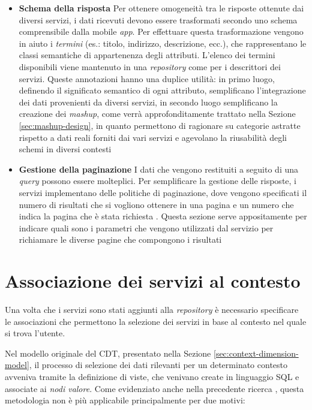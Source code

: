 \begin{itemize}
\begin{enumerate}
	\end{enumerate}
	\item \textbf{Schema della risposta}
	Per ottenere omogeneità tra le risposte ottenute dai diversi servizi, i dati ricevuti devono essere trasformati secondo uno schema comprensibile dalla mobile \emph{app}. Per effettuare questa trasformazione vengono in aiuto i \emph{termini} (es.: titolo, indirizzo, descrizione, ecc.), che rappresentano le classi semantiche di appartenenza degli attributi. L'elenco dei termini disponibili viene mantenuto in una \emph{repository} come per i descrittori dei servizi. Queste annotazioni hanno una duplice utilità: in primo luogo, definendo il significato semantico di ogni attributo, semplificano l'integrazione dei dati provenienti da diversi servizi, in secondo luogo semplificano la creazione dei \emph{mashup}, come verrà approfonditamente trattato nella Sezione \ref{sec:mashup-design}, in quanto permettono di ragionare su categorie astratte rispetto a dati reali forniti dai vari servizi e agevolano la riusabilità degli schemi in diversi contesti 
	\item \textbf{Gestione della paginazione}
	I dati che vengono restituiti a seguito di una \emph{query} possono essere molteplici. Per semplificare la gestione delle risposte, i servizi implementano delle politiche di paginazione, dove vengono specificati il numero di risultati che si vogliono ottenere in una pagina e un numero che indica la pagina che è stata richiesta \cite{masse2011rest}. Questa sezione serve appositamente per indicare quali sono i parametri che vengono utilizzati dal servizio per richiamare le diverse pagine che compongono i risultati
\end{itemize}

\section{Associazione dei servizi al contesto\label{sec:associazione-servizi-cdt}}

Una volta che i servizi sono stati aggiunti alla \emph{repository} è necessario specificare le associazioni che permettono la selezione dei servizi in base al contesto nel quale si trova l'utente.

Nel modello originale del CDT, presentato nella Sezione \ref{sec:context-dimension-model}, il processo di selezione dei dati rilevanti per un determinato contesto avveniva tramite la definizione di viste, che venivano create in linguaggio SQL e associate ai \emph{nodi valore}. Come evidenziato anche nella precedente ricerca \cite{rizzo2015progettazione}, questa metodologia non è più applicabile principalmente per due motivi:

